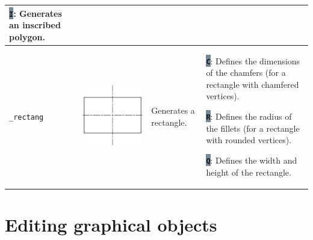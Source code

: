 \documentclass[..]{../IEEEphot}
\newcommand{\param}[1]{\colorbox{LightSlateGray}{\color{Navy}\texttt{\textbf{#1}}}}
\begin{document}
\begin{center}
\begin{longtable}{m{.1\linewidth}m{.2\linewidth}m{.3\linewidth}m{.3\linewidth}}
\param{I}: Generates an inscribed polygon.  \\
\midrule
\texttt{\_rectang} & \includegraphics[width = 0.8\linewidth, keepaspectratio]{../images/jpg/_rectang.jpg} & Generates a rectangle. & 
\param{C}: Defines the dimensions of the chamfers (for a rectangle with chamfered vertices).

\param{R}: Defines the radius of the fillets (for a rectangle with rounded vertices).

\param{Q}: Defines the width and height of the rectangle.

\\
\bottomrule
\end{longtable}
\end{center}

\clearpage

\section{Editing graphical objects}
\end{document}
